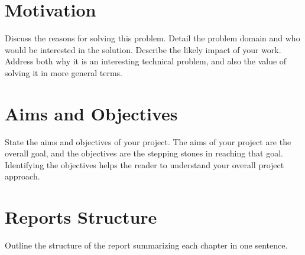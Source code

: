 \section{Motivation}
Discuss the reasons for solving this problem. Detail the problem domain and who would be interested in the solution. Describe the likely impact of your work. Address both why it is an interesting technical problem, and also the value of solving it in more general terms.
\section{Aims and Objectives}
State the aims and objectives of your project. The aims of your project are the overall goal, and the objectives are the stepping stones in reaching that goal. Identifying the objectives helps the reader to understand your overall project approach.
\section{Reports Structure}
Outline the structure of the report summarizing each chapter in one sentence.